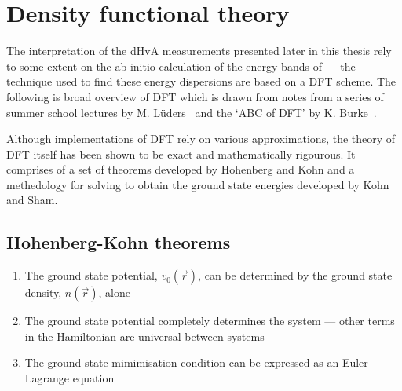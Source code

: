 
\section{Density functional theory}
\label{Sec:Theo:Dft}

The interpretation of the \ac{dHvA} measurements presented later in this thesis rely to some extent on the ab-initio calculation of the energy bands of \BaFeP --- the technique used to find these energy dispersions are based on a \ac{DFT} scheme. The following is broad overview of \ac{DFT} which is drawn from notes from a series of summer school lectures by M. L\"uders~\cite{Luders2010} and the `ABC of DFT' by K. Burke~\cite{Burke2003}.

 Although implementations of \ac{DFT} rely on various approximations, the theory of \ac{DFT} itself has been shown to be exact and mathematically rigourous. It comprises of a set of theorems developed by Hohenberg and Kohn and a methedology for solving to obtain the ground state energies developed by Kohn and Sham.

\subsection{Hohenberg-Kohn theorems}

\begin{enumerate}
    \item The ground state potential, $v_0(\vec{r})$, can be determined by the ground state density, $n(\vec{r})$, alone~\cite{Hohenberg1964, Levy1979}
    \item The ground state potential completely determines the system --- other terms in the Hamiltonian are universal between systems~\cite{Hohenberg1964}
    \item The ground state mimimisation condition can be expressed as an Euler-Lagrange equation~\cite{Hohenberg1964}
\end{enumerate}

